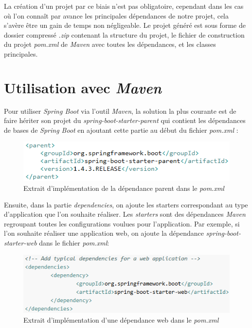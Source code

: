 \documentclass{polytech/polytech}
\begin{document}
La création d'un projet par ce biais n'est pas obligatoire, cependant dans les cas où l'on connaît par avance les principales dépendances de notre projet, cela s'avère être un gain de temps non négligeable. Le projet généré est sous forme de dossier compressé \textit{.zip} contenant la structure du projet, le fichier de construction du projet \textit{pom.xml} de \textit{Maven} avec toutes les dépendances, et les classes principales. 


\section{Utilisation avec \textit{Maven}}
\label{sec:utilisationMaven}


Pour utiliser \textit{Spring Boot} via l’outil \textit{Maven}, la solution la plus courante est de faire hériter son projet du \textit{spring-boot-starter-parent} qui contient les dépendances de bases de \textit{Spring Boot} en ajoutant cette partie au début du fichier \textit{pom.xml} :

\begin{figure}
	\includegraphics[scale=0.75]{images/parentSpringBoot}
	\caption{Extrait d'implémentation de la dépendance parent dans le \textit{pom.xml}}
	\label{fig:parentSpringBoot}
\end{figure}

Ensuite, dans la partie \textit{dependencies}, on ajoute les starters correspondant au type d’application que l’on souhaite réaliser. Les \textit{starters} sont des dépendances \textit{Maven} regroupant toutes les configurations voulues pour l’application.  Par exemple, si l'on souhaite réaliser une application web, on ajoute la dépendance \textit{spring-boot-starter-web} dans le fichier \textit{pom.xml}: 

\begin{figure}
	\includegraphics[scale=0.75]{images/dependencySpringBoot}
	\caption{Extrait d'implémentation d'une dépendance web dans le \textit{pom.xml}}
	\label{fig:dependencySpringBoot}
\end{figure}
\end{document}
